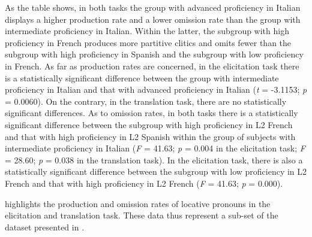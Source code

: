 \documentclass[output=paper,modfonts,nonflat,newtxmath]{langsci/langscibook}
\begin{document}
As the table shows, in both tasks the group with advanced proficiency in Italian displays a higher production rate and a lower omission rate than the group with intermediate proficiency in Italian. Within the latter, the subgroup with high proficiency in French produces more partitive clitics and omits fewer than the subgroup with high proficiency in Spanish and the subgroup with low proficiency in French. As far as production rates are concerned, in the elicitation task there is a statistically significant difference between the group with intermediate proficiency in Italian and that with advanced proficiency in Italian (\textit{t} = -3.1153; \textit{p} = 0.0060). On the contrary, in the translation task, there are no statistically significant differences. As to omission rates, in both tasks there is a statistically significant difference between the subgroup with high proficiency in L2 French and that with high proficiency in L2 Spanish within the group of subjects with intermediate proficiency in Italian (\textit{F} = 41.63; \textit{p} = 0.004 in the elicitation task; \textit{F} = 28.60; \textit{p} = 0.038 in the translation task). In the elicitation task, there is also a statistically significant difference between the subgroup with low proficiency in L2 French and that with high proficiency in L2 French (\textit{F} = 41.63; \textit{p} = 0.000).



 highlights the production and omission rates of locative pronouns in the elicitation and translation task. These data thus represent a sub-set of the dataset presented in .
\end{document}

